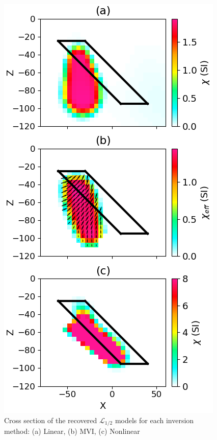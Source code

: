 \begin{figure}[htb]
    \vspace{-0.1cm}
    \begin{center}
    \includegraphics[width=\columnwidth]{figures/Lp5.png}
    \end{center}
    \vspace{-0.5cm}
\caption{
    Cross section of the recovered $\mathcal{L}_{1/2}$ models for each inversion method: (a) Linear, (b) MVI, (c) Nonlinear
}
\label{fig:Lp5}
\vspace{-0.1cm}
\end{figure}
